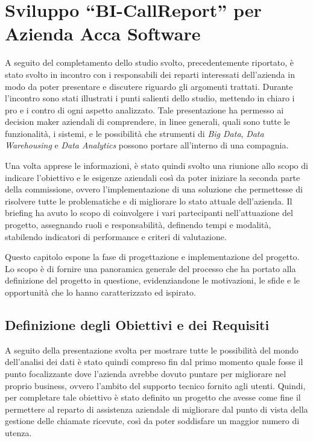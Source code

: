 \chapter{Sviluppo ``BI-CallReport'' per Azienda Acca Software}
\label{ch:Project}

A seguito del completamento dello studio svolto, precedentemente riportato, è stato svolto in incontro con i responsabili dei reparti interessati dell'azienda in modo da poter presentare e discutere riguardo gli argomenti trattati. Durante l'incontro sono stati illustrati i punti salienti dello studio, mettendo in chiaro i pro e i contro di ogni aspetto analizzato. Tale presentazione ha permesso ai decision maker aziendali di comprendere, in linee generali, quali sono tutte le funzionalità, i sistemi, e le possibilità che strumenti di \textit{Big Data}, \textit{Data Warehousing} e \textit{Data Analytics} possono portare all'interno di una compagnia. 

Una volta apprese le informazioni, è stato quindi svolto una riunione allo scopo di indicare l'obiettivo e le esigenze aziendali così da poter iniziare la seconda parte della commissione, ovvero l'implementazione di una soluzione che permettesse di risolvere tutte le problematiche e di migliorare lo stato attuale dell'azienda. Il briefing ha avuto lo scopo di coinvolgere i vari partecipanti nell'attuazione del progetto, assegnando ruoli e responsabilità, definendo tempi e modalità, stabilendo indicatori di performance e criteri di valutazione.

Questo capitolo espone la fase di progettazione e implementazione del progetto. Lo scopo è di fornire una panoramica generale del processo che ha portato alla definizione del progetto in questione, evidenziandone le motivazioni, le sfide e le opportunità che lo hanno caratterizzato ed ispirato.

\section{Definizione degli Obiettivi e dei Requisiti}

A seguito della presentazione svolta per mostrare tutte le possibilità del mondo dell'analisi dei dati è stato quindi compreso fin dal primo momento quale fosse il punto focalizzante dove l'azienda avrebbe dovuto puntare per migliorare nel proprio business, ovvero l'ambito del supporto tecnico fornito agli utenti. Quindi, per completare tale obiettivo è stato definito un progetto che avesse come fine il permettere al reparto di assistenza aziendale di migliorare dal punto di vista della gestione delle chiamate ricevute, così da poter soddisfare un maggior numero di utenza.

